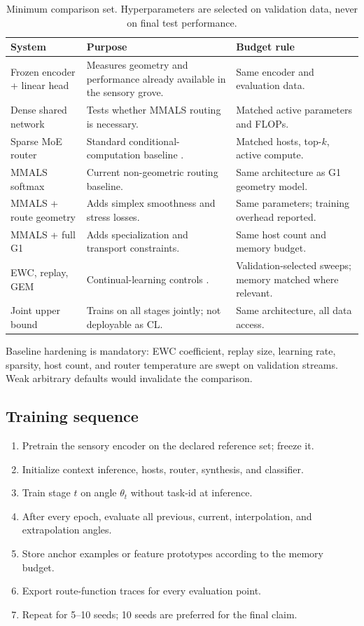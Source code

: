 \documentclass[11pt,a4paper]{article}
\begin{document}
\begin{table}[H]
\centering
\caption{Minimum comparison set. Hyperparameters are selected on validation data, never on final test performance.}
\label{tab:systems}
\begin{tabularx}{\textwidth}{@{}p{3.2cm}Y p{3.4cm}@{}}
\toprule
\textbf{System} & \textbf{Purpose} & \textbf{Budget rule} \\
\midrule
Frozen encoder + linear head & Measures geometry and performance already available in the sensory grove. & Same encoder and evaluation data. \\
Dense shared network & Tests whether MMALS routing is necessary. & Matched active parameters and FLOPs. \\
Sparse MoE router & Standard conditional-computation baseline \citep{shazeer2017moe,fedus2022switch}. & Matched hosts, top-\(k\), active compute. \\
MMALS softmax & Current non-geometric routing baseline. & Same architecture as G1 geometry model. \\
MMALS + route geometry & Adds simplex smoothness and stress losses. & Same parameters; training overhead reported. \\
MMALS + full G1 & Adds specialization and transport constraints. & Same host count and memory budget. \\
EWC, replay, GEM & Continual-learning controls \citep{kirkpatrick2017ewc,lopezpaz2017gem,rolnick2019replay}. & Validation-selected sweeps; memory matched where relevant. \\
Joint upper bound & Trains on all stages jointly; not deployable as CL. & Same architecture, all data access. \\
\bottomrule
\end{tabularx}
\end{table}

Baseline hardening is mandatory: EWC coefficient, replay size, learning rate, sparsity, host count, and router temperature are swept on validation streams. Weak arbitrary defaults would invalidate the comparison.

\subsection{Training sequence}

\begin{enumerate}
\item Pretrain the sensory encoder on the declared reference set; freeze it.
\item Initialize context inference, hosts, router, synthesis, and classifier.
\item Train stage \(t\) on angle \(\theta_t\) without task-id at inference.
\item After every epoch, evaluate all previous, current, interpolation, and extrapolation angles.
\item Store anchor examples or feature prototypes according to the memory budget.
\item Export route-function traces for every evaluation point.
\item Repeat for 5--10 seeds; 10 seeds are preferred for the final claim.
\end{enumerate}
\end{document}
